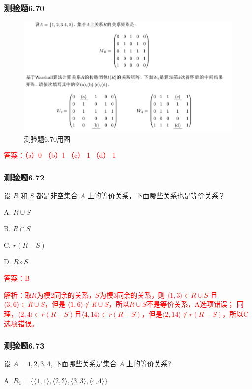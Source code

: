 \documentclass[UTF8, heading=true]{ctexart}
\begin{document}
\subsubsection{测验题6.70}
\begin{figure}[htbp]
    \centering
    \includegraphics[width=1\textwidth]{6.70.jpg} %
    \caption{测验题6.70用图}
\end{figure}

\textcolor{red}{答案：（a）0 （b）1 （c） 1 （d） 1}

\subsubsection{测验题6.72}

设 $R$ 和 $S$ 都是非空集合 $A$ 上的等价关系，下面哪些关系也是等价关系？

A. $R \cup S$

B. $R \cap S$

C. $r(R-S)$

D. $R \circ S$

\textcolor{red}{答案：B}

\textcolor{red}{解析：取$R$为模2同余的关系，$S$为模3同余的关系，则 $\langle 1,3\rangle \in R \cup S$ 且 $\langle 3,6\rangle \in R \cup S$，但是 $\langle 1,6\rangle \notin R \cup S$，所以$R \cup S$不是等价关系，A选项错误；
同理，$\langle 2,4 \rangle \in r(R-S)$且$\langle 4,14 \rangle \in r(R-S)$，但是$\langle 2,14 \rangle \notin r(R-S)$，所以C选项错误。}

\subsubsection{测验题6.73}

设 $A={1,2,3,4}$, 下面哪些关系是集合 $A$ 上的等价关系?

A. $R_1=\{\langle 1,1\rangle,\langle 2,2\rangle,\langle 3,3\rangle,\langle 4,4\rangle\}$
\end{document}
